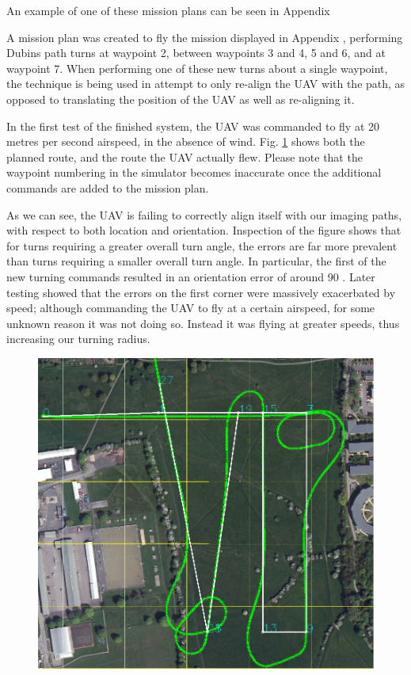 An example of one of these mission plans can be seen in Appendix %

A mission plan was created to fly the mission displayed in Appendix %
, performing Dubins path turns at waypoint 2, between waypoints 3 and 4, 5 and 6, and at waypoint 7. When performing one of these new turns about a single waypoint, the technique is being used in attempt to only re-align the UAV with the path, as opposed to translating the position of the UAV as well as re-aligning it. 

In the first test of the finished system, the UAV was commanded to fly at 20 metres per second airspeed, in the absence of wind. Fig. \ref{fig:6520nowind} shows both the planned route, and the route the UAV actually flew. Please note that the waypoint numbering in the simulator becomes inaccurate once the additional commands are added to the mission plan. 

As we can see, the UAV is failing to correctly align itself with our imaging paths, with respect to both location and orientation. Inspection of the figure shows that for turns requiring a greater overall turn angle, the errors are far more prevalent than turns requiring a smaller overall turn angle. In particular, the first of the new turning commands resulted in an orientation error of around 90 \degree. Later testing showed that the errors on the first corner were massively exacerbated by speed; although commanding the UAV to fly at a certain airspeed, for some unknown reason it was not doing so. Instead it was flying at greater speeds, thus increasing our turning radius.

\begin{figure}[htbp!] 
\centering    
\includegraphics[width=\textwidth]{65_20_NoWind}
\caption[Flying Dubins path turns in the absence of wind]{}
\label{fig:6520nowind}
\end{figure} 

